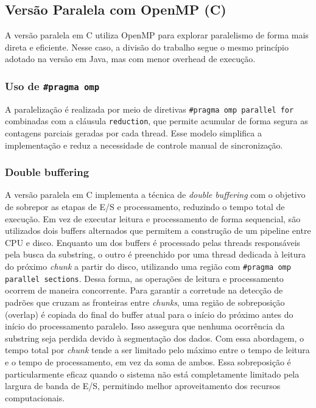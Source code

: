 \documentclass[10pt,twocolumn,a4paper]{article}
\begin{document}
\subsection{Versão Paralela com OpenMP (C)}

A versão paralela em C utiliza OpenMP para explorar paralelismo de forma mais direta e eficiente. Nesse caso, a divisão do trabalho segue o mesmo princípio adotado na versão em Java, mas com menor overhead de execução.

\subsubsection{Uso de \texttt{\#pragma omp}}

A paralelização é realizada por meio de diretivas \texttt{\#pragma omp parallel for} combinadas com a cláusula \texttt{reduction}, que permite acumular de forma segura as contagens parciais geradas por cada thread. Esse modelo simplifica a implementação e reduz a necessidade de controle manual de sincronização.

\subsubsection{Double buffering}
A versão paralela em C implementa a técnica de \textit{double buffering} com o objetivo de sobrepor as etapas de E/S e processamento, reduzindo o tempo total de execução. Em vez de executar leitura e processamento de forma sequencial, são utilizados dois buffers alternados que permitem a construção de um pipeline entre CPU e disco. Enquanto um dos buffers é processado pelas threads responsáveis pela busca da substring, o outro é preenchido por uma thread dedicada à leitura do próximo \textit{chunk} a partir do disco, utilizando uma região com \texttt{\#pragma omp parallel sections}. Dessa forma, as operações de leitura e processamento ocorrem de maneira concorrente. Para garantir a corretude na detecção de padrões que cruzam as fronteiras entre \textit{chunks}, uma região de sobreposição (overlap) é copiada do final do buffer atual para o início do próximo antes do início do processamento paralelo. Isso assegura que nenhuma ocorrência da substring seja perdida devido à segmentação dos dados. Com essa abordagem, o tempo total por \textit{chunk} tende a ser limitado pelo máximo entre o tempo de leitura e o tempo de processamento, em vez da soma de ambos. Essa sobreposição é particularmente eficaz quando o sistema não está completamente limitado pela largura de banda de E/S, permitindo melhor aproveitamento dos recursos computacionais.
\end{document}

